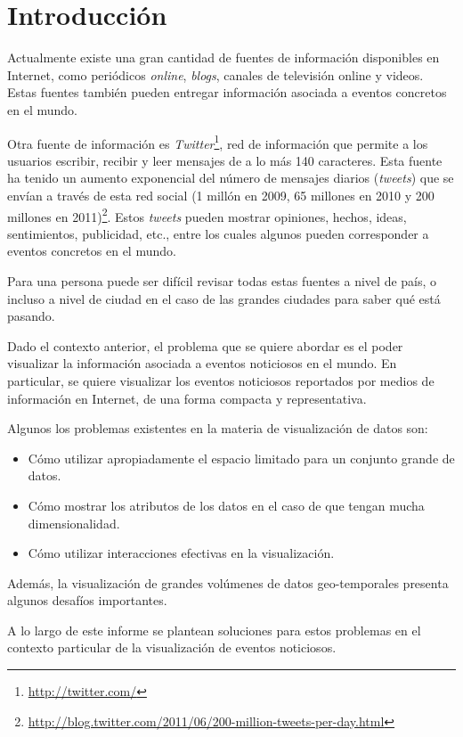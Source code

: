 \documentclass[10pt]{article}
\begin{document}
\section{Introducción}
	Actualmente existe una gran cantidad de fuentes de información disponibles en Internet, como periódicos \emph{online}, \emph{blogs}, canales de televisión online y videos. Estas fuentes también pueden entregar información asociada a eventos concretos en el mundo. 
	
	Otra fuente de información es \emph{Twitter}\footnote{\url{http://twitter.com/}}, red de información que permite a los usuarios escribir, recibir y leer mensajes de a lo más 140 caracteres. Esta fuente ha tenido un aumento exponencial del número de mensajes diarios (\emph{tweets}) que se envían a través de esta red social (1 millón en 2009, 65 millones en 2010 y 200 millones en 2011)\footnote{\url{http://blog.twitter.com/2011/06/200-million-tweets-per-day.html}}. Estos \emph{tweets} pueden mostrar opiniones, hechos, ideas, sentimientos, publicidad, etc., entre los cuales algunos pueden corresponder a eventos concretos en el mundo.
	
	Para una persona puede ser difícil revisar todas estas fuentes a nivel de país, o incluso a nivel de ciudad en el caso de las grandes ciudades para saber qué está pasando.
	
	Dado el contexto anterior, el problema que se quiere abordar es el poder visualizar la información asociada a eventos noticiosos en el mundo. En particular, se quiere visualizar los eventos noticiosos reportados por medios de información en Internet, de una forma compacta y representativa. 
	
	Algunos los problemas existentes en la materia de visualización de datos son:
	
	\begin{itemize}
		\item Cómo utilizar apropiadamente el espacio limitado para un conjunto grande de datos.
		\item Cómo mostrar los atributos de los datos en el caso de que tengan mucha dimensionalidad.
		\item Cómo utilizar interacciones efectivas en la visualización.
	\end{itemize}
	
	Además, la visualización de grandes volúmenes de datos geo-temporales presenta algunos desafíos importantes.
	
	A lo largo de este informe se plantean soluciones para estos problemas en el contexto particular de la visualización de eventos noticiosos.
	
\end{document}

